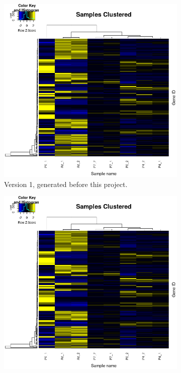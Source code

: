 \documentclass{article}
\begin{document}
\begin{landscape}
\begin{figure}
     \centering
     \begin{subfigure}[b]{0.68\textwidth}
         \centering
         \includegraphics[width=\textwidth]{plots/clustered_v1.png}
         \caption{Version 1, generated before this project.}
     \end{subfigure}%
     \hfill
     \begin{subfigure}[b]{0.68\textwidth}
         \centering
         \includegraphics[width=\textwidth]{plots/clustered_v2.png}

\end{subfigure}
\end{figure}
\end{landscape}
\end{document}
